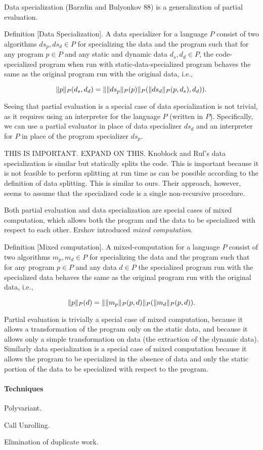 Data specialization (Barzdin and Bulyonkov 88) is a generalization of
partial evaluation.

Definition [Data Specialization].  A data specializer for a language
$P$ consist of two algorithms $ds_p, ds_d \in P$ for specializing the
data and the program such that for any program $p \in P$ and any
static and dynamic data $d_s, d_d \in P$, the code-specialized program
when run with static-data-specialized program behaves the same as the
original program run with the original data, i.e.,

\[
\drun{P}{p} (d_s, d_d) = \drun{P}{\drun{P}{ds_p} (p)} (\drun{P}{ds_d}
(p,d_s), d_d)).
\]

Seeing that partial evaluation is a special case of data
specialization is not trivial, as it requires using an interpreter for
the language $P$ (written in $P$).  Specifically, we can use a partial
evaluator in place of data specializer $ds_d$ and an  interpreter for $P$ in
place of the program specializer $ds_p$. 


THIS IS IMPORTANT. EXPAND ON THIS.  Knoblock and Ruf's data
specialization is similar but statically splits the code. This is
important because it is not feasible to perform splitting at run time
as can be possible according to the definition of data splitting. This
is similar to ours.  Their approach, however, seems to assume that the
specialized code is a single non-recursive procedure.


Both partial evaluation and data specialization are special cases of
mixed computation, which allows both the program and the data to be
specialized with respect to each other.  Ershov introduced {\em mixed
  computation}. 


Definition [Mixed computation]. A mixed-computation for a language $P$
consist of two algorithms $m_p, m_d \in P$ for specializing the data
and the program such that for any program $p \in P$ and any data $d
\in P$ the specialized program run with the specialized data behaves
the same as the original program run with the original data, i.e.,

\[
\drun{P}{p} (d) = \drun{P}{\drun{P}{m_p} (p,d)} (\drun{P}{m_d} (p,d)).
\]


Partial evaluation is trivially a special case of mixed computation,
because it allows a transformation of the program only on the static
data, and because it allows only a simple transformation on data (the
extraction of the dynamic data).  Similarly data specialization is a
special case of mixed computation because it allows the program to be
specialized in the absence of data and only the static portion of the
data to be specialized with respect to the program.


\paragraph{Techniques}

Polyvariant.

Call Unrolling.

Elimination of duplicate work.


